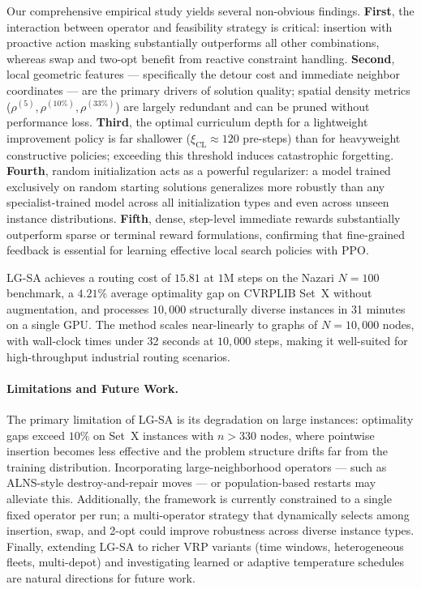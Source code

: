 \documentclass[letterpaper]{article} %
\begin{document}
Our comprehensive empirical study yields several non-obvious findings. \textbf{First}, the interaction between operator and feasibility strategy is critical: insertion with proactive action masking substantially outperforms all other combinations, whereas swap and two-opt benefit from reactive constraint handling. \textbf{Second}, local geometric features --- specifically the detour cost and immediate neighbor coordinates --- are the primary drivers of solution quality; spatial density metrics ($\rho^{(5)}, \rho^{(10\%)}, \rho^{(33\%)}$) are largely redundant and can be pruned without performance loss. \textbf{Third}, the optimal curriculum depth for a lightweight improvement policy is far shallower ($\xi_{\text{CL}} \approx 120$ pre-steps) than for heavyweight constructive policies; exceeding this threshold induces catastrophic forgetting. \textbf{Fourth}, random initialization acts as a powerful regularizer: a model trained exclusively on random starting solutions generalizes more robustly than any specialist-trained model across all initialization types and even across unseen instance distributions. \textbf{Fifth}, dense, step-level immediate rewards substantially outperform sparse or terminal reward formulations, confirming that fine-grained feedback is essential for learning effective local search policies with PPO.

LG-SA achieves a routing cost of $15.81$ at $1$M steps on the Nazari $N=100$ benchmark, a $4.21\%$ average optimality gap on CVRPLIB Set~X without augmentation, and processes $10{,}000$ structurally diverse instances in 31 minutes on a single GPU. The method scales near-linearly to graphs of $N=10{,}000$ nodes, with wall-clock times under 32 seconds at $10{,}000$ steps, making it well-suited for high-throughput industrial routing scenarios.

\paragraph{Limitations and Future Work.}
The primary limitation of LG-SA is its degradation on large instances: optimality gaps exceed $10\%$ on Set~X instances with $n>330$ nodes, where pointwise insertion becomes less effective and the problem structure drifts far from the training distribution. Incorporating large-neighborhood operators --- such as ALNS-style destroy-and-repair moves --- or population-based restarts may alleviate this. Additionally, the framework is currently constrained to a single fixed operator per run; a multi-operator strategy that dynamically selects among insertion, swap, and 2-opt could improve robustness across diverse instance types. Finally, extending LG-SA to richer VRP variants (time windows, heterogeneous fleets, multi-depot) and investigating learned or adaptive temperature schedules are natural directions for future work.
\end{document}
